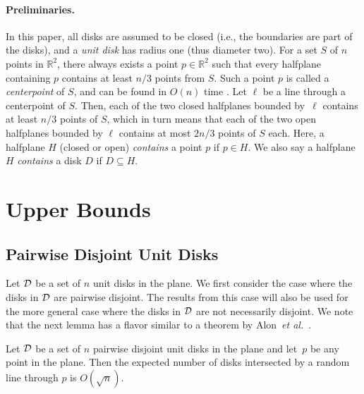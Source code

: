 \documentclass{llncs}
\newcommand{\real}{\mathbb{R}}
\newcommand{\etal}{\textit{et al.}}
\begin{document}
\paragraph{Preliminaries.}
In this paper, all disks are assumed to be closed (i.e., the boundaries are part of the disks), and
a \emph{unit disk} has radius one (thus diameter two).
For a set $S$ of $n$ points in $\real^2$, there always exists a point $p \in \real^2$
such that every halfplane containing $p$ contains at least $n/3$ points
from $S$.
Such a point $p$ is called a \emph{centerpoint} of $S$, and can be found
in $O(n)$ time \cite{DBLP:journals/dcg/JadhavM94}.
Let $\ell$ be a line through a centerpoint of $S$.
Then, each of the two closed halfplanes bounded by~$\ell$ contains at least $n/3$ 
points of $S$,
which in turn means that 
each of the two open halfplanes bounded by $\ell$
contains at most $2n/3$ points of $S$ each.
Here, a halfplane $H$ (closed or open) \emph{contains} a point $p$ if
$p \in H$.
We also say a halfplane~$H$ \emph{contains} a disk $D$ if $D \subseteq H$.



\section{Upper Bounds}
\subsection{Pairwise Disjoint Unit Disks}

Let $\cal{D}$ be a set of $n$ unit disks in the plane.
We first consider the case where the disks in $\cal{D}$ are pairwise disjoint.
The results from this case will also be used for the more general case where the disks in $\cal{D}$
are not necessarily disjoint.
We note that the next lemma has a flavor similar to a theorem by Alon~\etal~\cite{DBLP:journals/dcg/AlonKP89}.


\begin{lemma}
\label{lem:disjoint_unit}
Let $\cal{D}$ be a set of $n$ pairwise disjoint unit disks in the plane and let~$p$ be any point in the plane.
Then the expected number of disks intersected by a random line through $p$ is $O(\sqrt{n})$.
\end{lemma}
\end{document}
